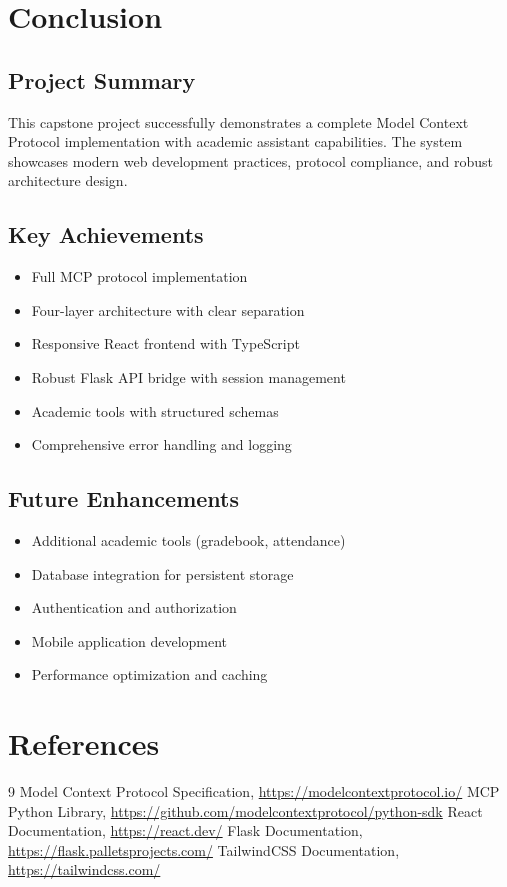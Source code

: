 \documentclass[12pt, a4paper]{report}
\begin{document}
\chapter{Conclusion}

\section{Project Summary}
This capstone project successfully demonstrates a complete Model Context Protocol implementation with academic assistant capabilities. The system showcases modern web development practices, protocol compliance, and robust architecture design.

\section{Key Achievements}
\begin{itemize}
    \item Full MCP protocol implementation
    \item Four-layer architecture with clear separation
    \item Responsive React frontend with TypeScript
    \item Robust Flask API bridge with session management
    \item Academic tools with structured schemas
    \item Comprehensive error handling and logging
\end{itemize}

\section{Future Enhancements}
\begin{itemize}
    \item Additional academic tools (gradebook, attendance)
    \item Database integration for persistent storage
    \item Authentication and authorization
    \item Mobile application development
    \item Performance optimization and caching
\end{itemize}

\chapter{References}

\begin{thebibliography}{9}
 Model Context Protocol Specification, \url{https://modelcontextprotocol.io/}
 MCP Python Library, \url{https://github.com/modelcontextprotocol/python-sdk}
 React Documentation, \url{https://react.dev/}
 Flask Documentation, \url{https://flask.palletsprojects.com/}
 TailwindCSS Documentation, \url{https://tailwindcss.com/}
\end{thebibliography}
\end{document}
